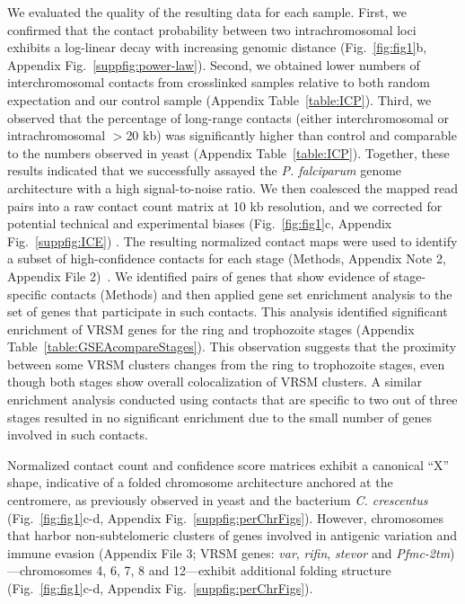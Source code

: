 We evaluated the quality of the resulting data for each sample. First, we
confirmed that the contact probability between two intrachromosomal loci
exhibits a log-linear decay with increasing genomic distance
(Fig.~\ref{fig:fig1}b, Appendix Fig.~\ref{suppfig:power-law}). Second,
we obtained lower numbers of interchromosomal contacts from crosslinked
samples relative to both random expectation and our control sample
(Appendix Table~\ref{table:ICP}). Third, we observed that the percentage
of long-range contacts (either interchromosomal or intrachromosomal $>$20 kb)
was significantly higher than control and comparable to the numbers observed
in yeast \citep{duan:three} (Appendix Table~\ref{table:ICP}). Together,
these results indicated that we successfully assayed the {\em P. falciparum}
genome architecture with a high signal-to-noise ratio. We then coalesced the
mapped read pairs into a raw contact count matrix at 10 kb resolution, and we
corrected for potential technical and experimental biases
\citep{imakaev:iterative} (Fig.~\ref{fig:fig1}c, Appendix
Fig.~\ref{suppfig:ICE}) . The resulting normalized contact maps were used to
identify a subset of high-confidence contacts for each stage (Methods,
Appendix Note 2, Appendix File 2)~\citep{ay:statistical}. We
identified pairs of genes that show evidence of stage-specific contacts
(Methods) and then applied gene set enrichment analysis to the set of genes
that participate in such contacts.  This analysis identified significant
enrichment of VRSM genes for the ring and trophozoite stages (Appendix
Table~\ref{table:GSEAcompareStages}). This observation suggests that the
proximity between some VRSM clusters changes from the ring to trophozoite
stages, even though both stages show overall colocalization of VRSM clusters.
A similar enrichment analysis conducted using contacts that are specific to
two out of three stages resulted in no significant enrichment due to the small
number of genes involved in such contacts.

Normalized contact count and confidence score matrices exhibit a canonical
``X'' shape, indicative of a folded chromosome architecture anchored at the
centromere, as previously observed in yeast \citep{duan:three,
tanizawa:mapping} and the bacterium {\em C. crescentus}
\citep{umbarger:three-dimensional} (Fig.~\ref{fig:fig1}c-d, Appendix
Fig.~\ref{suppfig:perChrFigs}). However, chromosomes that harbor
non-subtelomeric clusters of genes involved in antigenic variation and immune
evasion (Appendix File 3; VRSM genes: {\em var}, {\em rifin}, {\em
stevor} and {\em Pfmc-2tm})---chromosomes 4, 6, 7, 8 and 12---exhibit
additional folding structure (Fig.~\ref{fig:fig1}c-d, Appendix
Fig.~\ref{suppfig:perChrFigs}).

